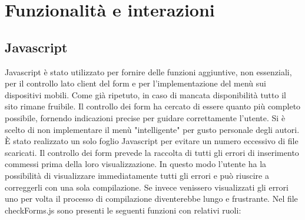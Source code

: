 \newpage
\section{Funzionalità e interazioni}
\subsection{Javascript}
Javascript è stato utilizzato per fornire delle funzioni aggiuntive, non essenziali, per il controllo lato client del form e per l'implementazione del menù sui dispositivi mobili. Come già ripetuto, in caso di mancata disponibilità tutto il sito rimane fruibile. 
Il controllo dei form ha cercato di essere quanto più completo possibile, fornendo indicazioni precise per guidare correttamente l'utente.
Si è scelto di non implementare il menù "intelligente" per gusto personale degli autori. 
È stato realizzato un solo foglio Javascript per evitare un numero eccessivo di file scaricati. Il controllo dei form prevede la raccolta di tutti gli errori di inserimento commessi prima della loro visualizzazione. In questo modo l'utente ha la possibilità di visualizzare immediatamente tutti gli errori e può riuscire a correggerli con una sola compilazione. Se invece venissero visualizzati gli errori uno per volta il processo di compilazione diventerebbe lungo e frustrante.
Nel file checkForms.js sono presenti le seguenti funzioni con relativi ruoli:
